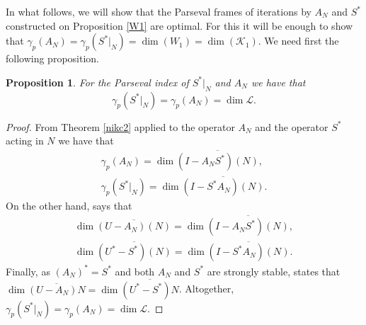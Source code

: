 \documentclass[a4paper,12pt]{amsart}
\def\KK{{\mathcal{K}}}
\newtheorem{proposition}[theorem]{Proposition}
\theoremstyle{definition}
\begin{document}
In what follows, we will show that the Parseval frames of iterations by $A_N$ and $S^*$ constructed on Proposition \ref{W1} are optimal. For this it will be enough to show that $\gamma_p(A_N) =\gamma_p(S^*|_N) =\dim(W_1)=\dim(\KK_1)$.  We need first the following proposition. 


\begin{proposition}\label{dimcoro}
For the Parseval index of $S^*|_N$ and $A_N$ we have that
\begin{equation*}
\gamma_p(S^*|_N)=\gamma_p(A_N)=\dim\mathcal{L}.
\end{equation*}
\end{proposition}

\begin{proof}
From Theorem \ref{nikc2} applied to the operator $A_N$ and the operator $S^*$ acting in $N$ we have that
\begin{gather*}
\gamma_p(A_N)=\dim\overline{(I-A_NS^*)(N)},
\\
\gamma_p(S^*|_N)=\dim\overline{(I-S^*A_N)(N)}.
\end{gather*}
On the other hand, \cite[II, Theorem 1.1]{NFBK10} says that
\begin{gather*}
\dim\overline{(U-A_N)(N)}=\dim\overline{(I-A_NS^*)(N)},
\\
\dim\overline{(U^*-S^*)(N)}=\dim\overline{(I-S^*A_N)(N)}.
\end{gather*}
Finally, as $(A_N)^*=S^*$ and both $A_N$ and $S^*$ are strongly stable, \cite[II, Theorem 1.2]{NFBK10} states that $\dim\overline{(U-A_N)N}=\dim\overline{(U^*-S^*)N}$. Altogether,
$\gamma_p(S^*|_N)=\gamma_p(A_N)=\dim\mathcal{L}$.
\end{proof}
\end{document}
